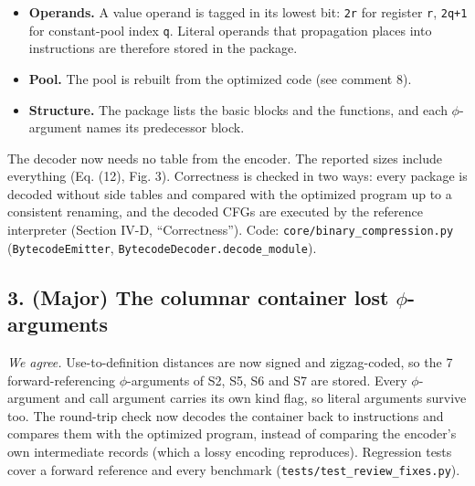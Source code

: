 \documentclass[11pt,a4paper]{article}
\begin{document}
\begin{itemize}
\item \textbf{Operands.} A value operand is tagged in its lowest bit: \texttt{2r} for register \texttt{r}, \texttt{2q+1} for constant-pool index \texttt{q}. Literal operands that propagation places into instructions are therefore stored in the package.
\item \textbf{Pool.} The pool is rebuilt from the optimized code (see comment 8).
\item \textbf{Structure.} The package lists the basic blocks and the functions, and each $\phi$-argument names its predecessor block.
\end{itemize}
The decoder now needs no table from the encoder. The reported sizes include everything (Eq. (12), Fig. 3). Correctness is checked in two ways: every package is decoded without side tables and compared with the optimized program up to a consistent renaming, and the decoded CFGs are executed by the reference interpreter (Section IV-D, ``Correctness''). Code: \texttt{core/binary\_compression.py} (\texttt{BytecodeEmitter}, \texttt{BytecodeDecoder.decode\_module}).

\subsection*{3. (Major) The columnar container lost $\phi$-arguments}
\emph{We agree.} Use-to-definition distances are now signed and zigzag-coded, so the 7 forward-referencing $\phi$-arguments of S2, S5, S6 and S7 are stored. Every $\phi$-argument and call argument carries its own kind flag, so literal arguments survive too. The round-trip check now decodes the container back to instructions and compares them with the optimized program, instead of comparing the encoder's own intermediate records (which a lossy encoding reproduces). Regression tests cover a forward reference and every benchmark (\texttt{tests/test\_review\_fixes.py}).
\end{document}

